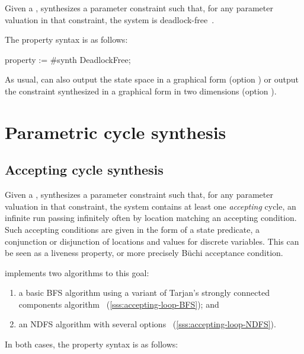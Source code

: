 Given a \NIPTA{}, \PDFC{} synthesizes a parameter constraint such that, for any parameter valuation in that constraint, the system is deadlock-free~\cite{Andre16}.

The property syntax is as follows:

\begin{IMITATORproperty}
property := #synth DeadlockFree;
\end{IMITATORproperty}

As usual, \imitator{} can also
output the state space in a graphical form (option )
or
output the constraint synthesized in a graphical form in two dimensions (option ).


\section{Parametric cycle synthesis}\label{ss:mode:LoopSynth}


\subsection{Accepting cycle synthesis}\label{ss:accepting-loop}
Given a \NIPTA{}, \imitator{} synthesizes a parameter constraint such that, for any parameter valuation in that constraint, the system contains at least one \emph{accepting} cycle, \ie{} an infinite run passing infinitely often by location matching an accepting condition.
Such accepting conditions are given in the form of a state predicate, \ie{} a conjunction or disjunction of locations and values for discrete variables.
This can be seen as a liveness property, or more precisely Büchi acceptance condition.

\imitator{} implements two algorithms to this goal:
\begin{enumerate}
	\item a basic BFS algorithm using a variant of Tarjan's strongly connected components algorithm~\cite{AAPP21} (\cref{sss:accepting-loop-BFS}); and
	\item an NDFS algorithm with several options~\cite{NPP18,AAPP21} (\cref{sss:accepting-loop-NDFS}).
\end{enumerate}

In both cases, the property syntax is as follows:

